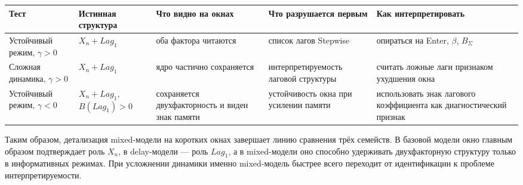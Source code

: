 \begin{center}
\label{tab:mixed-window-tests}
\end{center}

{\def\LTcaptype{none} %
\begin{longtable}[]{@{}
  >{\raggedright\arraybackslash}p{}
  >{\raggedright\arraybackslash}p{}
  >{\raggedright\arraybackslash}p{}
  >{\raggedright\arraybackslash}p{}
  >{\raggedright\arraybackslash}p{}@{}}
\toprule\noalign{}
\begin{minipage}[b]{\linewidth}\raggedright
Тест
\end{minipage} & \begin{minipage}[b]{\linewidth}\raggedright
Истинная структура
\end{minipage} & \begin{minipage}[b]{\linewidth}\raggedright
Что видно на окнах
\end{minipage} & \begin{minipage}[b]{\linewidth}\raggedright
Что разрушается первым
\end{minipage} & \begin{minipage}[b]{\linewidth}\raggedright
Как интерпретировать
\end{minipage} \\
\midrule\noalign{}
\endhead
\bottomrule\noalign{}
\endlastfoot
Устойчивый режим, \(\gamma>0\) & \(X_n + Lag_1\) & оба фактора читаются & список лагов Stepwise & опираться на Enter, \(\beta\), \(B_\Sigma\) \\
Сложная динамика, \(\gamma>0\) & \(X_n + Lag_1\) & ядро частично сохраняется & интерпретируемость лаговой структуры & считать ложные лаги признаком ухудшения окна \\
Устойчивый режим, \(\gamma<0\) & \(X_n + Lag_1\), \(B(Lag_1)>0\) & сохраняется двухфакторность и виден знак памяти & устойчивость окна при усилении памяти & использовать знак лагового коэффициента как диагностический признак \\
\end{longtable}
}

Таким образом, детализация mixed-модели на коротких окнах завершает линию сравнения трёх семейств. В базовой модели окно главным образом подтверждает роль \(X_n\), в delay-модели --- роль \(Lag_1\), а в mixed-модели оно способно удерживать двухфакторную структуру только в информативных режимах. При усложнении динамики именно mixed-модель быстрее всего переходит от идентификации к проблеме интерпретируемости.

